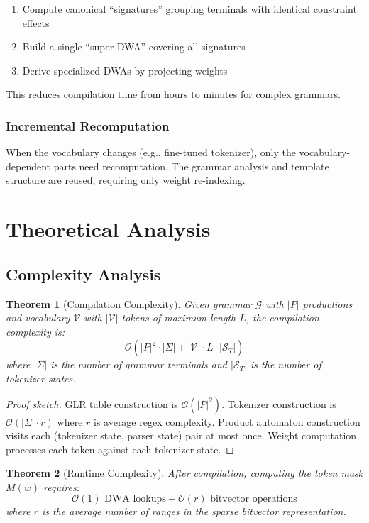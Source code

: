 \documentclass[11pt,a4paper]{article}
\newcommand{\bigO}{\mathcal{O}}
\newcommand{\vocab}{\mathcal{V}}
\newcommand{\grammar}{\mathcal{G}}
\newcommand{\states}{\mathcal{S}}
\theoremstyle{plain}
\newtheorem{theorem}{Theorem}[section]
\theoremstyle{definition}
\theoremstyle{remark}
\begin{document}
\begin{enumerate}
\item Compute canonical ``signatures'' grouping terminals with identical constraint effects
\item Build a single ``super-DWA'' covering all signatures
\item Derive specialized DWAs by projecting weights
\end{enumerate}

This reduces compilation time from hours to minutes for complex grammars.

\subsubsection{Incremental Recomputation}

When the vocabulary changes (e.g., fine-tuned tokenizer), only the vocabulary-dependent parts need recomputation. The grammar analysis and template structure are reused, requiring only weight re-indexing.

\section{Theoretical Analysis}
\label{sec:theory}

\subsection{Complexity Analysis}

\begin{theorem}[Compilation Complexity]
Given grammar $\grammar$ with $|P|$ productions and vocabulary $\vocab$ with $|\vocab|$ tokens of maximum length $L$, the compilation complexity is:
\[
\bigO(|P|^2 \cdot |\Sigma| + |\vocab| \cdot L \cdot |\states_T|)
\]
where $|\Sigma|$ is the number of grammar terminals and $|\states_T|$ is the number of tokenizer states.
\end{theorem}

\begin{proof}[Proof sketch]
GLR table construction is $\bigO(|P|^2)$. Tokenizer construction is $\bigO(|\Sigma| \cdot r)$ where $r$ is average regex complexity. Product automaton construction visits each (tokenizer state, parser state) pair at most once. Weight computation processes each token against each tokenizer state.
\end{proof}

\begin{theorem}[Runtime Complexity]
After compilation, computing the token mask $M(w)$ requires:
\[
\bigO(1) \text{ DWA lookups} + \bigO(r) \text{ bitvector operations}
\]
where $r$ is the average number of ranges in the sparse bitvector representation.
\end{theorem}
\end{document}
